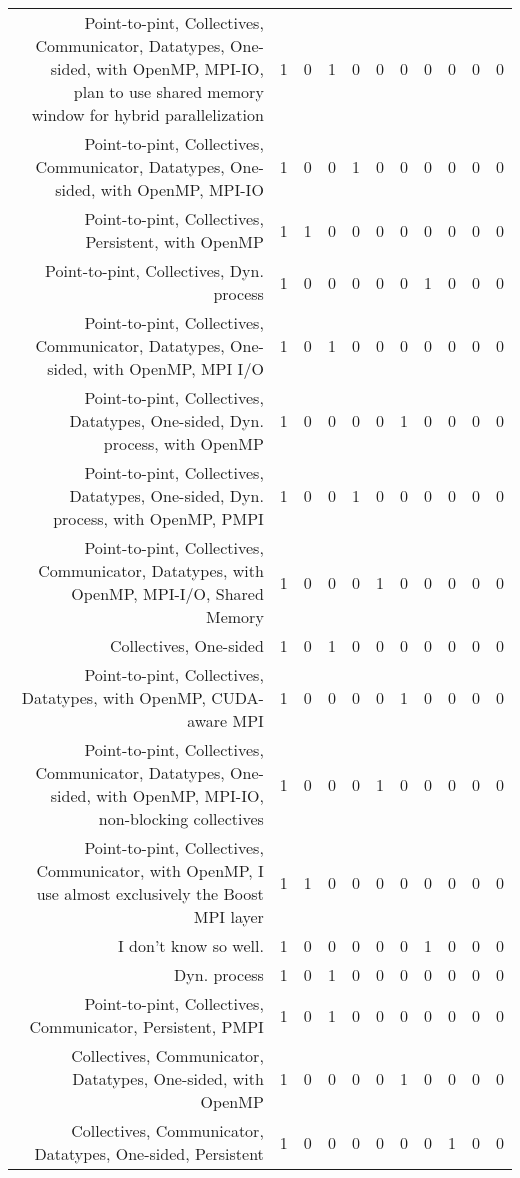 {\begin{landscape}
\begin{longtable}[htb]{r|c|c|c|c|c|c|c|c|c|c}
{Point-to-pint, Collectives, Communicator, Datatypes, One-sided, with OpenMP, MPI-IO, plan to use shared memory window for hybrid parallelization} & 1 & 0 & 1 & 0 & 0 & 0 & 0 & 0 & 0 & 0 \\%
{Point-to-pint, Collectives, Communicator, Datatypes, One-sided, with OpenMP, MPI-IO} & 1 & 0 & 0 & 1 & 0 & 0 & 0 & 0 & 0 & 0 \\%
{Point-to-pint, Collectives, Persistent, with OpenMP} & 1 & 1 & 0 & 0 & 0 & 0 & 0 & 0 & 0 & 0 \\%
{Point-to-pint, Collectives, Dyn. process} & 1 & 0 & 0 & 0 & 0 & 0 & 1 & 0 & 0 & 0 \\%
{Point-to-pint, Collectives, Communicator, Datatypes, One-sided, with OpenMP, MPI I/O} & 1 & 0 & 1 & 0 & 0 & 0 & 0 & 0 & 0 & 0 \\%
{Point-to-pint, Collectives, Datatypes, One-sided, Dyn. process, with OpenMP} & 1 & 0 & 0 & 0 & 0 & 1 & 0 & 0 & 0 & 0 \\%
{Point-to-pint, Collectives, Datatypes, One-sided, Dyn. process, with OpenMP, PMPI} & 1 & 0 & 0 & 1 & 0 & 0 & 0 & 0 & 0 & 0 \\%
{Point-to-pint, Collectives, Communicator, Datatypes, with OpenMP, MPI-I/O, Shared Memory} & 1 & 0 & 0 & 0 & 1 & 0 & 0 & 0 & 0 & 0 \\%
{Collectives, One-sided} & 1 & 0 & 1 & 0 & 0 & 0 & 0 & 0 & 0 & 0 \\%
{Point-to-pint, Collectives, Datatypes, with OpenMP, CUDA-aware MPI} & 1 & 0 & 0 & 0 & 0 & 1 & 0 & 0 & 0 & 0 \\%
{Point-to-pint, Collectives, Communicator, Datatypes, One-sided, with OpenMP, MPI-IO, non-blocking collectives} & 1 & 0 & 0 & 0 & 1 & 0 & 0 & 0 & 0 & 0 \\%
{Point-to-pint, Collectives, Communicator, with OpenMP, I use almost exclusively the Boost MPI layer} & 1 & 1 & 0 & 0 & 0 & 0 & 0 & 0 & 0 & 0 \\%
{I don't know so well.} & 1 & 0 & 0 & 0 & 0 & 0 & 1 & 0 & 0 & 0 \\%
{Dyn. process} & 1 & 0 & 1 & 0 & 0 & 0 & 0 & 0 & 0 & 0 \\%
{Point-to-pint, Collectives, Communicator, Persistent, PMPI} & 1 & 0 & 1 & 0 & 0 & 0 & 0 & 0 & 0 & 0 \\%
{Collectives, Communicator, Datatypes, One-sided, with OpenMP} & 1 & 0 & 0 & 0 & 0 & 1 & 0 & 0 & 0 & 0 \\%
{Collectives, Communicator, Datatypes, One-sided, Persistent} & 1 & 0 & 0 & 0 & 0 & 0 & 0 & 1 & 0 & 0 \\%

\end{longtable}
\end{landscape}}

